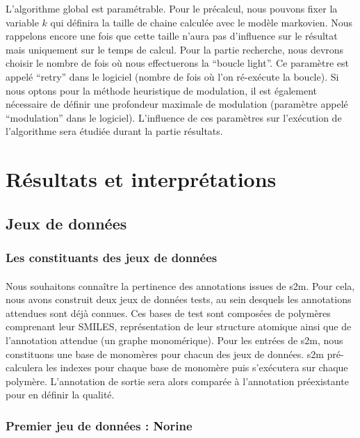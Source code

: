 \documentclass[12pt,french,twoside]{report}
\begin{document}
L'algorithme global est paramétrable.
Pour le précalcul, nous pouvons fixer la variable $k$ qui définira la taille de chaine calculée avec le modèle markovien.
Nous rappelons encore une fois que cette taille n'aura pas d'influence sur le résultat mais uniquement sur le temps de calcul.
Pour la partie recherche, nous devrons choisir le nombre de fois où nous effectuerons la ``boucle light''.
Ce paramètre est appelé ``retry'' dans le logiciel (nombre de fois où l'on ré-exécute la boucle).
Si nous optons pour la méthode heuristique de modulation, il est également nécessaire de définir une profondeur maximale de modulation (paramètre appelé ``modulation'' dans le logiciel).
L'influence de ces paramètres sur l'exécution de l'algorithme sera étudiée durant la partie résultats.




\section{Résultats et interprétations}

\subsection{Jeux de données}

\subsubsection{Les constituants des jeux de données}

\paragraph{}Nous souhaitons connaître la pertinence des annotations issues de s2m.
Pour cela, nous avons construit deux jeux de données tests, au sein desquels les annotations attendues sont déjà connues.
Ces bases de test sont composées de polymères comprenant leur SMILES, représentation de leur structure atomique ainsi que de l'annotation attendue (un graphe monomérique).
Pour les entrées de s2m, nous constituons une base de monomères pour chacun des jeux de données.
s2m pré-calculera les indexes pour chaque base de monomère puis s'exécutera sur chaque polymère.
L'annotation de sortie sera alors comparée à l'annotation préexistante pour en définir la qualité.


\subsubsection{Premier jeu de données : Norine}
\end{document}
